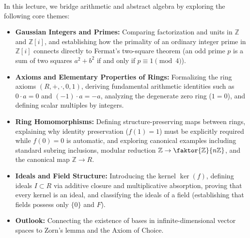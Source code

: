 

\begin{overview}
In this lecture, we bridge arithmetic and abstract algebra by exploring the following core themes:
\begin{itemize}
    \item \textbf{Gaussian Integers and Primes:} Comparing factorization and units in $\mathbb{Z}$ and $\mathbb{Z}[i]$, and establishing how the primality of an ordinary integer prime in $\mathbb{Z}[i]$ connects directly to Fermat's two-square theorem (an odd prime $p$ is a sum of two squares $a^2 + b^2$ if and only if $p \equiv 1 \pmod 4$).
    \item \textbf{Axioms and Elementary Properties of Rings:} Formalizing the ring axioms $(R, +, \cdot, 0, 1)$, deriving fundamental arithmetic identities such as $0 \cdot a = 0$ and $(-1) \cdot a = -a$, analyzing the degenerate zero ring ($1 = 0$), and defining scalar multiples by integers.
    \item \textbf{Ring Homomorphisms:} Defining structure-preserving maps between rings, explaining why identity preservation ($f(1) = 1$) must be explicitly required while $f(0) = 0$ is automatic, and exploring canonical examples including standard subring inclusions, modular reduction $\mathbb{Z} \to \faktor{\mathbb{Z}}{n\mathbb{Z}}$, and the canonical map $\mathbb{Z} \to R$.
    \item \textbf{Ideals and Field Structure:} Introducing the kernel $\ker(f)$, defining ideals $I \subset R$ via additive closure and multiplicative absorption, proving that every kernel is an ideal, and classifying the ideals of a field (establishing that fields possess only $\{0\}$ and $F$).
    \item \textbf{Outlook:} Connecting the existence of bases in infinite-dimensional vector spaces to Zorn's lemma and the Axiom of Choice.
\end{itemize}
\end{overview}

